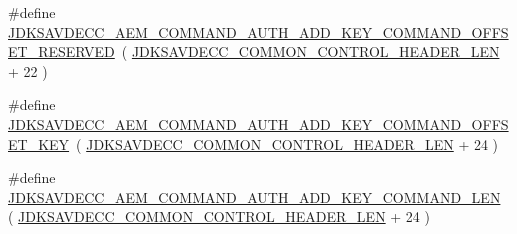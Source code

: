 \begin{DoxyCompactItemize}
\item 
\#define \hyperlink{group__command__auth__add__key_ga85d688d1255e6f603bd99ced10bd8a89}{J\+D\+K\+S\+A\+V\+D\+E\+C\+C\+\_\+\+A\+E\+M\+\_\+\+C\+O\+M\+M\+A\+N\+D\+\_\+\+A\+U\+T\+H\+\_\+\+A\+D\+D\+\_\+\+K\+E\+Y\+\_\+\+C\+O\+M\+M\+A\+N\+D\+\_\+\+O\+F\+F\+S\+E\+T\+\_\+\+R\+E\+S\+E\+R\+V\+ED}~( \hyperlink{group__jdksavdecc__avtp__common__control__header_gaae84052886fb1bb42f3bc5f85b741dff}{J\+D\+K\+S\+A\+V\+D\+E\+C\+C\+\_\+\+C\+O\+M\+M\+O\+N\+\_\+\+C\+O\+N\+T\+R\+O\+L\+\_\+\+H\+E\+A\+D\+E\+R\+\_\+\+L\+EN} + 22 )
\item 
\#define \hyperlink{group__command__auth__add__key_ga4affcdd6b142c005c95b2fb049e10b2f}{J\+D\+K\+S\+A\+V\+D\+E\+C\+C\+\_\+\+A\+E\+M\+\_\+\+C\+O\+M\+M\+A\+N\+D\+\_\+\+A\+U\+T\+H\+\_\+\+A\+D\+D\+\_\+\+K\+E\+Y\+\_\+\+C\+O\+M\+M\+A\+N\+D\+\_\+\+O\+F\+F\+S\+E\+T\+\_\+\+K\+EY}~( \hyperlink{group__jdksavdecc__avtp__common__control__header_gaae84052886fb1bb42f3bc5f85b741dff}{J\+D\+K\+S\+A\+V\+D\+E\+C\+C\+\_\+\+C\+O\+M\+M\+O\+N\+\_\+\+C\+O\+N\+T\+R\+O\+L\+\_\+\+H\+E\+A\+D\+E\+R\+\_\+\+L\+EN} + 24 )
\item 
\#define \hyperlink{group__command__auth__add__key_ga49ca7fc0da221477a34bc67310da6e1d}{J\+D\+K\+S\+A\+V\+D\+E\+C\+C\+\_\+\+A\+E\+M\+\_\+\+C\+O\+M\+M\+A\+N\+D\+\_\+\+A\+U\+T\+H\+\_\+\+A\+D\+D\+\_\+\+K\+E\+Y\+\_\+\+C\+O\+M\+M\+A\+N\+D\+\_\+\+L\+EN}~( \hyperlink{group__jdksavdecc__avtp__common__control__header_gaae84052886fb1bb42f3bc5f85b741dff}{J\+D\+K\+S\+A\+V\+D\+E\+C\+C\+\_\+\+C\+O\+M\+M\+O\+N\+\_\+\+C\+O\+N\+T\+R\+O\+L\+\_\+\+H\+E\+A\+D\+E\+R\+\_\+\+L\+EN} + 24 )
\end{DoxyCompactItemize}
